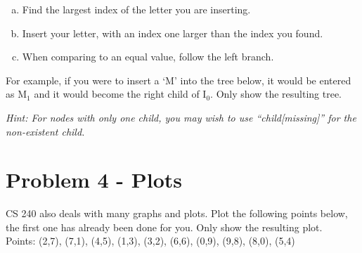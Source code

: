 \documentclass[12pt]{article}
\begin{document}
\begin{enumerate}[a)]
	\item Find the largest index of the letter you are inserting. 
	\item Insert your letter, with an index one larger than the index you found.
	\item When comparing to an equal value, follow the left branch.

\end{enumerate}

For example, if you were to insert a `M' into the tree below, it would be entered as M$_1$ and it would become the right child of I$_0$. Only show the resulting tree.

\begin{center}\end{center}

{\it Hint: For nodes with only one child, you may wish to use ``child[missing]'' for the non-existent child.}

\clearpage


\section*{Problem 4 - Plots}

CS 240 also deals with many graphs and plots. Plot the following points below, the first one has already been done for you. Only show the resulting plot.\\
Points: (2,7), (7,1), (4,5), (1,3), (3,2), (6,6), (0,9), (9,8), (8,0), (5,4)

\begin{center}
\end{center}
\end{document}
